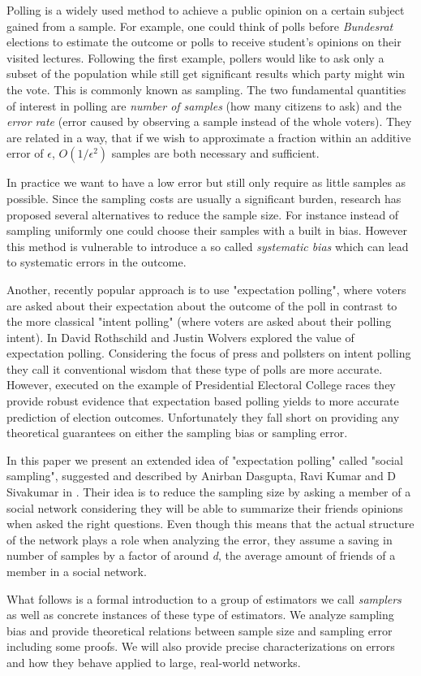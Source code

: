 Polling is a widely used method to achieve a public opinion on a certain subject gained from a sample. For example, one could think of polls before \textit{Bundesrat} elections to estimate the outcome or polls to receive student's opinions on their visited lectures.
Following the first example, pollers would like to ask only a subset of the population while still get significant results which party might win the vote. This is commonly known as sampling.
The two fundamental quantities of interest in polling are \textit{number of samples} (how many citizens to ask) and the \textit{error rate} (error caused by observing a sample instead of the whole voters). They are related in a way, that if we wish to approximate a fraction within an additive error of $\epsilon$, $O(1/\epsilon^{2})$ samples are both necessary and sufficient.

In practice we want to have a low error but still only require as little samples as possible.
Since the sampling costs are usually a significant burden, research has proposed several alternatives to reduce the sample size.
For instance instead of sampling uniformly one could choose their samples with a built in bias.
However this method is vulnerable to introduce a so called \textit{systematic bias} which can lead to systematic errors in the outcome.

Another, recently popular approach is to use "expectation polling", where voters are asked about their expectation about the outcome of the poll in contrast to the more classical "intent polling" (where voters are asked about their polling intent). In \cite{rothschild2009forecasting} David Rothschild and Justin Wolvers explored the value of expectation polling. Considering the focus of press and pollsters on intent polling they call it conventional wisdom that these type of polls are more accurate. However, executed on the example of Presidential Electoral College races they provide robust evidence that expectation based polling yields to more accurate prediction of election outcomes.
Unfortunately they fall short on providing any theoretical guarantees on either the sampling bias or sampling error.

In this paper we present an extended idea of "expectation polling" called "social sampling", suggested and described by Anirban Dasgupta, Ravi Kumar and D Sivakumar in \cite{dasgupta2012social}.
Their idea is to reduce the sampling size by asking a member of a social network considering they will be able to summarize their friends opinions when asked the right questions.
Even though this means that the actual structure of the network plays a role when analyzing the error, they assume a saving in number of samples by a factor of around \textit{d}, the average amount of friends of a member in a social network.

What follows is a formal introduction to a group of estimators we call \textit{samplers} as well as concrete instances of these type of estimators. We analyze sampling bias and provide theoretical relations between sample size and sampling error including some proofs.
We will also provide precise characterizations on errors and how they behave applied to large, real-world networks.
